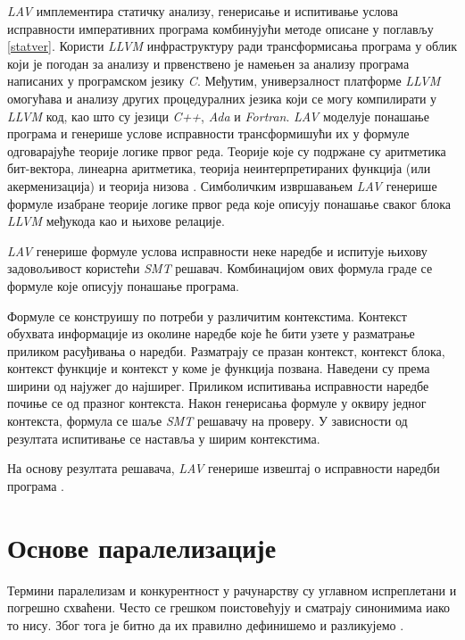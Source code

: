 \documentclass[12pt,oneside]{memoir}
\newtheorem{definic}{Дефиниција}
\begin{document}
	\textit{LAV} имплементира статичку анализу, генерисање и испитивање услова исправности императивних програма комбинујући методе описане у поглављу \ref{statver}. Користи \textit{LLVM} инфраструктуру ради трансформисања програма у облик који је погодан за анализу и првенствено је намењен за анализу програма написаних у програмском језику \textit{C}. Међутим, универзалност платформе \textit{LLVM} омогућава и анализу других процедуралних језика који се могу компилирати у \textit{LLVM} код, као што су језици \textit{C++}, \textit{Ada} и \textit{Fortran}. \textit{LAV} моделује понашање програма и генерише услове исправности трансформишући их у формуле одговарајуће теорије логике првог реда. Теорије које су подржане су аритметика бит-вектора, линеарна аритметика, теорија неинтерпретираних функција (или акерменизација) и теорија низова \cite{smt}.  Симболичким извршавањем \textit{LAV} генерише формуле изабране теорије логике првог реда које описују понашање сваког блока \textit{LLVM} међукода као и њихове релације. 
	
	\textit{LAV} генерише формуле услова исправности неке наредбе и испитује њихову задовољивост користећи \textit{SMT} решавач. Комбинацијом ових формула граде се формуле које описују понашање програма. 
	
	 Формуле се конструишу по потреби у различитим контекстима. Контекст обухвата информације из околине наредбе које ће бити узете у разматрање приликом расуђивања о наредби. Разматрају се празан контекст, контекст блока, контекст функције и контекст у коме је функција позвана. Наведени су према ширини од најужег до најширег. Приликом испитивања исправности наредбе почиње се од празног контекста.  Након генерисања формуле у оквиру једног контекста, формула се шаље \textit{SMT} решавачу на проверу. У зависности од резултата испитивање се наставља у ширим контекстима. 
	 
 На основу резултата решавача, \textit{LAV} генерише извештај о исправности наредби програма \cite{mvjdev}. 	
	 
	
\chapter{Основе паралелизације} \label{paralelizacija}
	Термини паралелизам и конкурентност у рачунарству су углавном испреплетани и погрешно схваћени. Често се грешком поистовећују и сматрају синонимима иако то нису. Због тога је битно да их правилно дефинишемо и разликујемо \cite{par_computing}.
\end{document}
